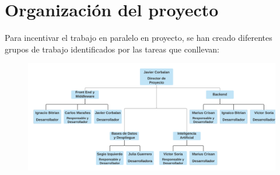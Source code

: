 \section{Organización del proyecto}
\label{organiz}

Para incentivar el trabajo en paralelo en proyecto, se han creado diferentes grupos de trabajo identificados por las tareas que conllevan:

\begin{figure}[h]
	\centering \includegraphics[scale=0.6]{figuras/organigrama.png}
\end{figure}
